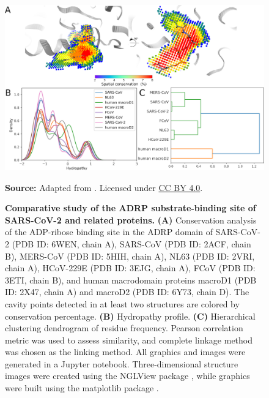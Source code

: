 \documentclass[Ingles]{phdthesis}
\begin{document}
\begin{figure}[h]
  \centering
  \includegraphics[scale=0.9]{images/adrp-sars-cov-2-conservation-analysis.png}
  \centerline{\tiny{\textbf{Source:} Adapted from \cite{guerra2021}. Licensed under \href{https://creativecommons.org/licenses/by/4.0/}{CC BY 4.0}.}}
  \caption[Comparative study of the ADRP substrate-binding site of SARS-CoV-2 and related proteins]{\textbf{Comparative study of the ADRP substrate-binding site of SARS-CoV-2 and related proteins.} \textbf{(A)} Conservation analysis of the ADP-ribose binding site in the ADRP domain of SARS-CoV-2 (PDB ID: 6WEN, chain A), SARS-CoV (PDB ID: 2ACF, chain B), MERS-CoV (PDB ID: 5HIH, chain A), NL63 (PDB ID: 2VRI, chain A), HCoV-229E (PDB ID: 3EJG, chain A), FCoV (PDB ID: 3ETI, chain B), and human macrodomain proteins macroD1 (PDB ID: 2X47, chain A) and macroD2 (PDB ID: 6Y73, chain D). The cavity points detected in at least two structures are colored by conservation percentage. \textbf{(B)} Hydropathy profile. \textbf{(C)} Hierarchical clustering dendrogram of residue frequency. Pearson correlation metric was used to assess similarity, and complete linkage method was chosen as the linking method. All graphics and images were generated in a Jupyter notebook. Three-dimensional structure images were created using the NGLView package \cite{nglview}, while graphics were built using the matplotlib package \cite{matplotlib}.}
  \label{fig:conservation-analysis}
\end{figure}
\end{document}
